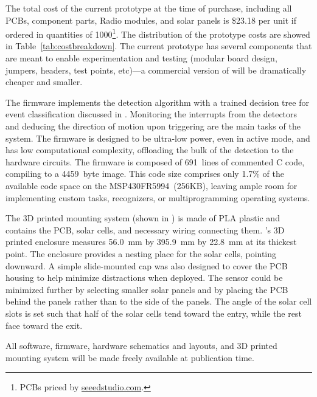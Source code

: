 The total cost of the current prototype at the time of purchase, including all PCBs, component parts, Radio modules, and solar panels is \$23.18 per unit if ordered in quantities of 1000\footnote{PCBs priced by \url{seeedstudio.com}.}.
The distribution of the prototype costs are showed in Table~\ref{tab:costbreakdown}.
The current prototype has several components that are meant to enable experimentation and testing (modular board design, jumpers, headers, test points, etc)---a commercial version of \sysname will be dramatically cheaper and smaller.



The \sysname firmware implements the detection algorithm with a trained decision tree for event classification discussed in .
Monitoring the interrupts from the detectors and deducing the direction of motion upon triggering are the main tasks of the system.
The firmware is designed to be ultra-low power, even in active mode, and has low computational complexity, offloading the bulk of the detection to the hardware circuits.
The \sysname firmware is composed of 691~lines of commented C code, compiling to a 4459~byte image. This code size comprises only 1.7\% of the available code space on the MSP430FR5994~(256KB), leaving ample room for implementing custom tasks, recognizers, or multiprogramming operating systems.

The 3D printed mounting system (shown in ) is made of PLA plastic and contains the PCB, solar cells, and necessary wiring connecting them.
\sysname's 3D printed enclosure measures \SI{56.0}{\milli\meter} by \SI{395.9}{\milli\meter} by \SI{22.8}{\milli\meter} at its thickest point. The enclosure provides a nesting place for the solar cells, pointing downward. 
A simple slide-mounted cap was also designed to cover the PCB housing to help minimize distractions when deployed.  The sensor could be minimized further by selecting smaller solar panels and by placing the PCB behind the panels rather than to the side of the panels.
The angle of the solar cell slots is set such that half of the solar cells tend toward the entry, while the rest face toward the exit.

All software, firmware, hardware schematics and layouts, and 3D printed mounting system will be made freely available at publication time.

